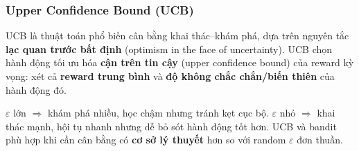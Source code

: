 \subsubsection{Upper Confidence Bound (UCB)}

\begin{phuongphap}[title={Upper Confidence Bound}]
UCB là thuật toán phổ biến cân bằng khai thác--khám phá, dựa trên nguyên tắc \textbf{lạc quan trước bất định} (optimism in the face of uncertainty).
UCB chọn hành động tối ưu hóa \textbf{cận trên tin cậy} (upper confidence bound) của reward kỳ vọng: xét cả \textbf{reward trung bình} và \textbf{độ không chắc chắn/biến thiên} của hành động đó.
\end{phuongphap}

\begin{luuy}[title={Gợi ý thực hành}]
$\varepsilon$ lớn $\Rightarrow$ khám phá nhiều, học chậm nhưng tránh kẹt cục bộ.
$\varepsilon$ nhỏ $\Rightarrow$ khai thác mạnh, hội tụ nhanh nhưng dễ bỏ sót hành động tốt hơn.
UCB và bandit phù hợp khi cần cân bằng có \textbf{cơ sở lý thuyết} hơn so với random $\varepsilon$ đơn thuần.
\end{luuy}

